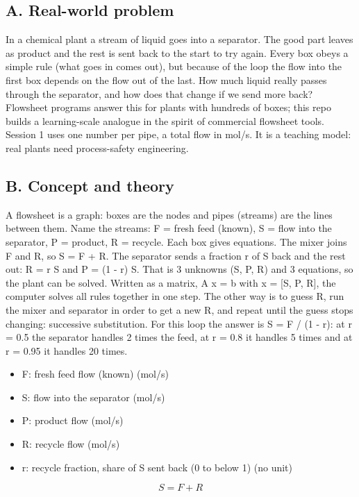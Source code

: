 \documentclass[11pt,a4paper]{article}
\begin{document}
\subsection*{A. Real-world problem}
In a chemical plant a stream of liquid goes into a separator. The good part leaves as product and the rest is sent back to the start to try again. Every box obeys a simple rule (what goes in comes out), but because of the loop the flow into the first box depends on the flow out of the last. How much liquid really passes through the separator, and how does that change if we send more back? Flowsheet programs answer this for plants with hundreds of boxes; this repo builds a learning-scale analogue in the spirit of commercial flowsheet tools. Session 1 uses one number per pipe, a total flow in mol/s. It is a teaching model: real plants need process-safety engineering.

\subsection*{B. Concept and theory}
A flowsheet is a graph: boxes are the nodes and pipes (streams) are the lines between them. Name the streams: F = fresh feed (known), S = flow into the separator, P = product, R = recycle. Each box gives equations. The mixer joins F and R, so S = F + R. The separator sends a fraction r of S back and the rest out: R = r S and P = (1 - r) S. That is 3 unknowns (S, P, R) and 3 equations, so the plant can be solved. Written as a matrix, A x = b with x = [S, P, R], the computer solves all rules together in one step. The other way is to guess R, run the mixer and separator in order to get a new R, and repeat until the guess stops changing: successive substitution. For this loop the answer is S = F / (1 - r): at r = 0.5 the separator handles 2 times the feed, at r = 0.8 it handles 5 times and at r = 0.95 it handles 20 times.

\begin{itemize}[nosep]
\item F: fresh feed flow (known) (mol/s)
\item S: flow into the separator (mol/s)
\item P: product flow (mol/s)
\item R: recycle flow (mol/s)
\item r: recycle fraction, share of S sent back (0 to below 1) (no unit)
\end{itemize}

\begin{equation*}
S = F + R
\end{equation*}
\end{document}
